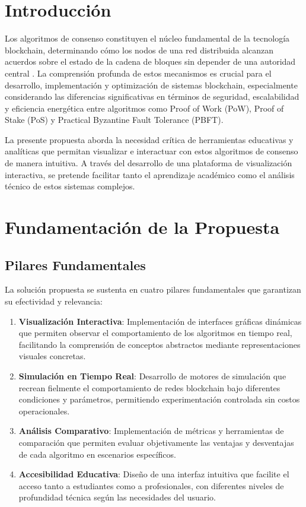 \documentclass[spanish,12pt,letterpaper]{report}
\begin{document}
\section{Introducción}

Los algoritmos de consenso constituyen el núcleo fundamental de la tecnología blockchain, determinando cómo los nodos de una red distribuida alcanzan acuerdos sobre el estado de la cadena de bloques sin depender de una autoridad central \cite{nakamoto2008bitcoin}. La comprensión profunda de estos mecanismos es crucial para el desarrollo, implementación y optimización de sistemas blockchain, especialmente considerando las diferencias significativas en términos de seguridad, escalabilidad y eficiencia energética entre algoritmos como Proof of Work (PoW), Proof of Stake (PoS) y Practical Byzantine Fault Tolerance (PBFT).

La presente propuesta aborda la necesidad crítica de herramientas educativas y analíticas que permitan visualizar e interactuar con estos algoritmos de consenso de manera intuitiva. A través del desarrollo de una plataforma de visualización interactiva, se pretende facilitar tanto el aprendizaje académico como el análisis técnico de estos sistemas complejos.

\section{Fundamentación de la Propuesta}

\subsection{Pilares Fundamentales}

La solución propuesta se sustenta en cuatro pilares fundamentales que garantizan su efectividad y relevancia:

\begin{enumerate}
    \item \textbf{Visualización Interactiva}: Implementación de interfaces gráficas dinámicas que permiten observar el comportamiento de los algoritmos en tiempo real, facilitando la comprensión de conceptos abstractos mediante representaciones visuales concretas.
    
    \item \textbf{Simulación en Tiempo Real}: Desarrollo de motores de simulación que recrean fielmente el comportamiento de redes blockchain bajo diferentes condiciones y parámetros, permitiendo experimentación controlada sin costos operacionales.
    
    \item \textbf{Análisis Comparativo}: Implementación de métricas y herramientas de comparación que permiten evaluar objetivamente las ventajas y desventajas de cada algoritmo en escenarios específicos.
    
    \item \textbf{Accesibilidad Educativa}: Diseño de una interfaz intuitiva que facilite el acceso tanto a estudiantes como a profesionales, con diferentes niveles de profundidad técnica según las necesidades del usuario.
\end{enumerate}
\end{document}
